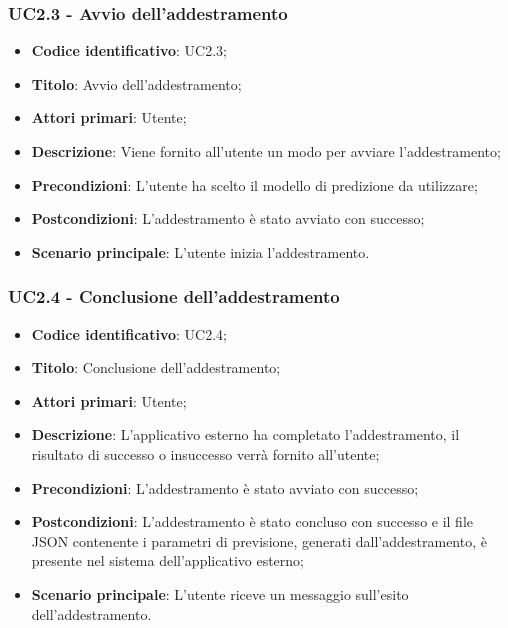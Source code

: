 \subsubsection{UC2.3 - Avvio dell'addestramento}
\begin{itemize}
    \item \textbf{Codice identificativo}: UC2.3;
    \item \textbf{Titolo}: Avvio dell'addestramento;
    \item \textbf{Attori primari}: Utente;
    \item \textbf{Descrizione}: Viene fornito all'utente un modo per avviare l'addestramento;
    \item \textbf{Precondizioni}: L'utente ha scelto il modello di predizione da utilizzare;
    \item \textbf{Postcondizioni}: L'addestramento è stato avviato con successo;
    \item \textbf{Scenario principale}: L'utente inizia l'addestramento.
\end{itemize}

\subsubsection{UC2.4 - Conclusione dell'addestramento}
\begin{itemize}
    \item \textbf{Codice identificativo}: UC2.4;
    \item \textbf{Titolo}: Conclusione dell'addestramento;
    \item \textbf{Attori primari}: Utente;
    \item \textbf{Descrizione}: L'applicativo esterno ha completato l'addestramento, il risultato di successo o insuccesso verrà fornito all'utente;
    \item \textbf{Precondizioni}: L'addestramento è stato avviato con successo;
    \item \textbf{Postcondizioni}: L'addestramento è stato concluso con successo e il file JSON contenente i parametri di previsione, generati dall'addestramento, è presente nel sistema dell'applicativo esterno;
    \item \textbf{Scenario principale}: L'utente riceve un messaggio sull'esito dell'addestramento.
\end{itemize}


